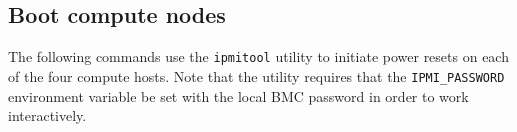 \documentclass[letterpaper]{article}
\begin{document}





\subsection{Boot compute nodes}

 
The following commands use the \texttt{ipmitool} utility to initiate power
resets on each of the four compute hosts. Note that the utility requires that
the \texttt{IPMI\_PASSWORD} environment variable be set with the local BMC password in
order to work interactively.
\end{document}
